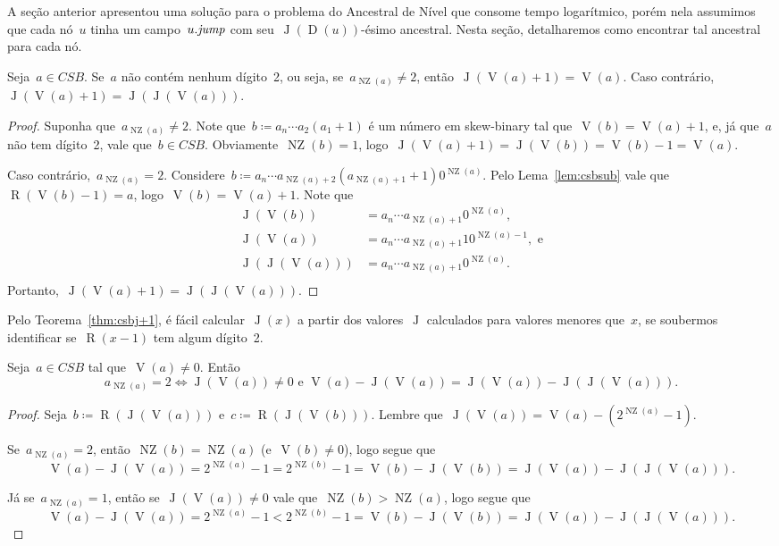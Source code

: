 \documentclass[main.tex]{subfiles}
\newcommand{\Dep}{\operatorname{D}}
\newcommand{\NZ}{\operatorname{NZ}}
\newcommand{\CSB}{\textit{CSB}}
\renewcommand{\V}{\operatorname{V}}
\newcommand{\R}{\operatorname{R}}
\newcommand{\J}{\operatorname{J}}
\begin{document}
A seção anterior apresentou uma solução para o problema do Ancestral de Nível que consome tempo logarítmico, porém nela assumimos que cada nó~$u$ tinha um campo~$u.\mathit{jump}$ com seu~\mbox{$\J(\Dep(u))$-ésimo} ancestral. Nesta seção, detalharemos como encontrar tal ancestral para cada nó.

\begin{theorem} \label{thm:csbj+1}
	Seja~$a \in \CSB$. Se~$a$ não contém nenhum dígito~2, ou seja, se~$a_{\NZ(a)} \neq 2$, então~$\J(\V(a) + 1) = \V(a)$. Caso contrário,~$\J(\V(a) + 1) = \J(\J(\V(a)))$.
\end{theorem}
\begin{proof}
	Suponha que~$a_{\NZ(a)} \neq 2$. Note que~$b \coloneqq a_n \cdots a_2 (a_1 + 1)$ é um número em skew-binary tal que~${\V(b) = \V(a) + 1}$, e, já que~$a$ não tem dígito~2, vale que~${b \in \CSB}$. Obviamente~${\NZ(b) = 1}$, logo~${\J(\V(a) + 1) = \J(\V(b)) = \V(b) - 1 = \V(a)}$.

	Caso contrário,~${a_{\NZ(a)} = 2}$. Considere~${b \coloneqq a_n \cdots a_{\NZ(a) + 2} (a_{\NZ(a) + 1} + 1) 0^{\NZ(a)}}$. Pelo Lema~\ref{lem:csbsub} vale que~${\R(\V(b) - 1) = a}$, logo~${\V(b) = \V(a) + 1}$. Note que \vspace{-2ex}
	\[
	\begin{array}{ll}
		\J(\V(b))     &= a_n \cdots a_{\NZ(a) + 1} 0^{\NZ(a)}, \\
		\J(\V(a))     &= a_n \cdots a_{\NZ(a) + 1} 10^{\NZ(a)-1},\text{ e} \\
		\J(\J(\V(a))) &= a_n \cdots a_{\NZ(a) + 1} 0^{\NZ(a)}. \\
	\end{array}
	\]
	Portanto,~$\J(\V(a) + 1) = \J(\J(\V(a)))$.
\end{proof}

Pelo Teorema~\ref{thm:csbj+1}, é fácil calcular~$\J(x)$ a partir dos valores~$\J$ calculados para valores menores que~$x$, se soubermos identificar se~$\R(x - 1)$ tem algum dígito~2.

\begin{proposition} \label{prop:csbjj}
	Seja~$a \in \CSB$ tal que~$\V(a) \neq 0$. Então \vspace{-2ex}
	$${a_{\NZ(a)} = 2 \iff \J(\V(a)) \neq 0 \text{ e } \V(a) - \J(\V(a)) = \J(\V(a)) - \J(\J(\V(a))).}$$
\end{proposition}
\begin{proof}
	Seja~$b \coloneqq \R(\J(\V(a)))$ e~${c \coloneqq \R(\J(\V(b)))}$. Lembre que~${\J(\V(a)) = \V(a) - (2^{\NZ(a)} - 1)}$.

	Se~$a_{\NZ(a)} = 2$, então~$\NZ(b) = \NZ(a)$ (e~$\V(b) \neq 0$), logo segue que~$$\V(a) - \J(\V(a)) = 2^{\NZ(a)} - 1 = 2^{\NZ(b)} - 1 = \V(b) - \J(\V(b)) = \J(\V(a)) - \J(\J(\V(a))).$$

	Já se~$a_{\NZ(a)} = 1$, então se~$\J(\V(a)) \neq 0$ vale que~$\NZ(b) > \NZ(a)$, logo segue que~$$\V(a) - \J(\V(a)) = 2^{\NZ(a)} - 1 < 2^{\NZ(b)} - 1 = \V(b) - \J(\V(b)) = \J(\V(a)) - \J(\J(\V(a))).$$
\end{proof}
\end{document}
